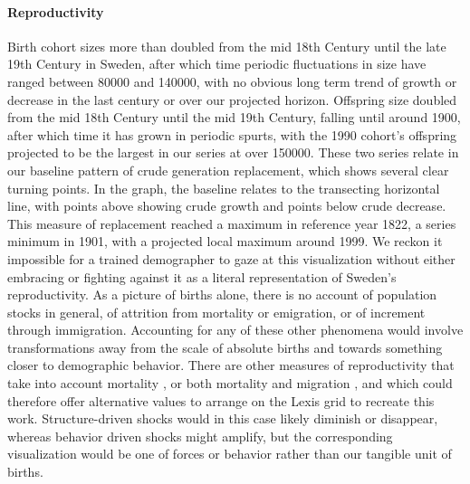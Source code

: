 \paragraph{Reproductivity}
Birth cohort sizes more than doubled from the mid 18th Century until the late 19th Century in Sweden, after which time periodic fluctuations in size have ranged between 80000 and 140000, with no obvious long term trend of growth or decrease in the last century or over our projected horizon. Offspring size doubled from the mid 18th Century until the mid 19th Century, falling until around 1900, after which time it has grown in periodic spurts, with the 1990 cohort's offspring projected to be the largest in our series at over 150000. These two series relate in our baseline pattern of crude generation replacement, which shows several clear turning points. In the graph, the baseline relates to the transecting horizontal line, with points above showing crude growth and points below crude decrease. This measure of replacement reached a maximum in reference year 1822, a series minimum in 1901, with a projected local maximum around 1999. We reckon it impossible for a trained demographer to gaze at this visualization without either embracing or fighting against it as a literal representation of Sweden's reproductivity. As a picture of births alone, there is no account of population stocks in general, of attrition from mortality or emigration, or of increment through immigration. Accounting for any of these other phenomena would involve transformations away from the scale of absolute births and towards something closer to demographic behavior. There are other measures of reproductivity that take into account mortality \citep{kuczynski1932fertility}, or both mortality and migration \citep[][inter alia]{hyrenius1951reproduction,ortega2007birth,preston2007intrinsic,wilson2013migration,ediev2014new}, and which could therefore offer alternative values to arrange on the Lexis grid to recreate this work. Structure-driven shocks would in this case likely diminish or disappear, whereas behavior driven shocks might amplify, but the corresponding visualization would be one of forces or behavior rather than our tangible unit of births. 

